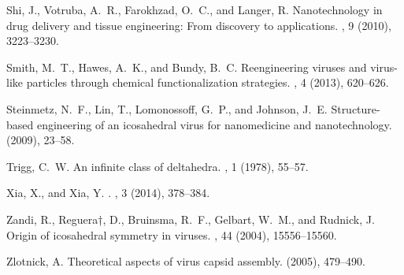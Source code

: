 \documentclass[11pt]{article}
\newcommand{\1}{\mathds{1}}
\begin{document}
\begin{thebibliography}{10}
{\sc Shi, J., Votruba, A.~R., Farokhzad, O.~C., and Langer, R.}
\newblock Nanotechnology in drug delivery and tissue engineering: From
  discovery to applications.
, 9 (2010), 3223--3230.

{\sc Smith, M.~T., Hawes, A.~K., and Bundy, B.~C.}
\newblock Reengineering viruses and virus-like particles through chemical
  functionalization strategies.
, 4 (2013), 620--626.

{\sc Steinmetz, N.~F., Lin, T., Lomonossoff, G.~P., and Johnson, J.~E.}
\newblock Structure-based engineering of an icosahedral virus for nanomedicine
  and nanotechnology.
 (2009),
  23--58.

{\sc Trigg, C.~W.}
\newblock An infinite class of deltahedra.
, 1 (1978), 55–57.

{\sc Xia, X., and Xia, Y.}
.
, 3 (2014), 378--384.

{\sc Zandi, R., Reguera†, D., Bruinsma, R.~F., Gelbart, W.~M., and Rudnick,
  J.}
\newblock Origin of icosahedral symmetry in viruses.
, 44 (2004), 15556--15560.

{\sc Zlotnick, A.}
\newblock Theoretical aspects of virus capsid assembly.
 (2005), 479--490.

\end{thebibliography}
\end{document}
